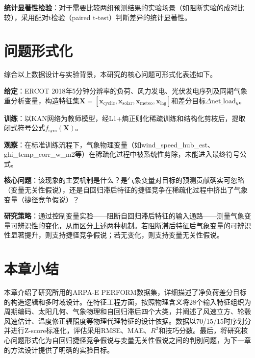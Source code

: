 \textbf{统计显著性检验}：对于需要比较两组预测结果的实验场景（如阻断实验的成对比较），采用配对t检验（paired t-test）判断差异的统计显著性。

\section{问题形式化}

综合以上数据设计与实验背景，本研究的核心问题可形式化表述如下。

\textbf{给定}：ERCOT 2018年5分钟分辨率的负荷、风力发电、光伏发电序列及同期气象重分析变量，构造特征集$\mathbf{X} = [\mathbf{x}_{\text{cyclic}}, \mathbf{x}_{\text{solar}}, \mathbf{x}_{\text{meteo}}, \mathbf{x}_{\text{lag}}]$和差分目标$\Delta\text{net\_load}_{h}$。

\textbf{训练}：以KAN网络为教师模型，经L1+熵正则化稀疏训练和结构化剪枝后，提取闭式符号公式$f_{\text{sym}}(\mathbf{X})$。

\textbf{观察}：在标准训练流程下，气象物理变量（如wind\_speed\_hub\_est、ghi\_temp\_corr\_w\_m2等）在稀疏化过程中被系统性剪除，未能进入最终符号公式。

\textbf{核心问题}：该现象的主要机制是什么？是气象变量对目标的预测贡献确实可忽略（变量无关性假说），还是自回归滞后特征的捷径竞争在稀疏化过程中挤出了气象变量（捷径竞争假说）？

\textbf{研究策略}：通过控制变量实验——阻断自回归滞后特征的输入通路——测量气象变量可辨识性的变化，从而区分上述两种机制。若阻断滞后特征后气象变量的可辨识性显著提升，则支持捷径竞争假说；若无变化，则支持变量无关性假说。

\section{本章小结}

本章介绍了研究所用的ARPA-E PERFORM数据集，详细描述了净负荷差分目标的构造逻辑和多时域设计。在特征工程方面，按照物理含义将28个输入特征组织为周期编码、太阳几何、气象物理和自回归滞后四个大类，并阐述了风速立方、轮毂风速估计、温度修正辐照度等物理代理特征的设计依据。数据以70/15/15时序划分并进行Z-score标准化，评估采用RMSE、MAE、$R^2$和技巧分数。最后，将研究核心问题形式化为自回归捷径竞争假说与变量无关性假说之间的判别问题，为下一章的方法设计提供了明确的实验目标。
